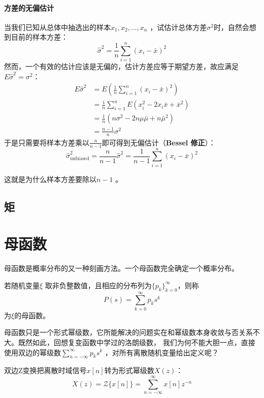\paragraph{方差的无偏估计}

当我们已知从总体中抽选出的样本\(x_1, x_2, \ldots, x_n\) ，试估计总体方差\(\sigma^2\)时，自然会想到目前的样本方差：
\[
    \hat{\sigma}^{2}= \frac{1}{n} \sum_{i=1}^{n} (x_i - \bar{x})^2
\]
然而，一个有效的估计应该是无偏的，估计方差应等于期望方差，故应满足\(E \hat{\sigma}^{2} = \sigma^{2}\)：
\begin{align*}
    E \hat{\sigma}^{2} &= E\left( \frac{1}{n} \sum_{i=1}^{n} (x_i -
    \bar{x})^2 \right)\\
    &= \frac{1}{n} \sum_{i=1}^{n} E\left( x_i^2 - 2x_i\bar{x} +
    \bar{x}^2 \right)\\
    &= \frac{1}{n} \left( n\sigma^2 - 2n\mu\bar{\mu} + n\bar{\mu}^2 \right)\\
    &= \frac{n-1}{n} \sigma^2
\end{align*}
于是只需要将样本方差乘以\(\frac{n}{n-1}\)即可得到无偏估计（\textbf{Bessel 修正}）：
\[
    \hat{\sigma}^{2}_{\text{unbiased}} = \frac{n}{n-1}
    \hat{\sigma}^{2} = \frac{1}{n-
    1} \sum_{i=1}^{n} (x_i - \bar{x})^2
\]

这就是为什么样本方差要除以\(n-1\) 。

\subsection{矩}
\section{母函数}
母函数是概率分布的又一种刻画方法。一个母函数完全确定一个概率分布。
\begin{definition}[母函数]
    若随机变量\(\xi\) 取非负整数值，且相应的分布列为\(\{p_k\}_{k=0}^{\infty}\)，则称
    \[
        P(s) = \sum_{k=0}^{\infty} p_k s^{k}
    \]
    为\(\xi\)的母函数。
\end{definition}

母函数只是一个形式幂级数，它所能解决的问题实在和幂级数本身收敛与否关系不大。既然如此，回想复变函数中学过的洛朗级数，
我们为何不能大胆一点，直接使用双边的幂级数\(\sum_{n=-\infty}^{\infty} p_{k}s^{k}
\) ，对所有离散随机变量给出定义呢？

\begin{definition}[双边Z变换]
    双边Z变换把离散时域信号\(x[n]\)转为形式幂级数\(X(z)\)：
    \[
        X(z) = \mathcal{Z}\{x[n]\} =\sum_{n=-\infty}^{\infty}
        x[n] z^{-n}
    \]
\end{definition}

